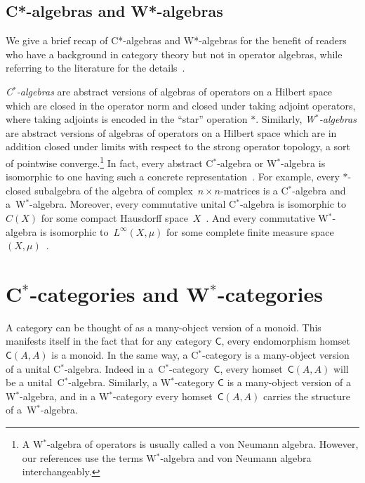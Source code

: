 \documentclass[reqno,T1,11pt]{amsproc}
\newcommand{\cat}[1]{\mathsf{#1}}		%
\theoremstyle{plain}
\theoremstyle{remark}
\numberwithin{equation}{section}
\begin{document}
\subsection*{C*-algebras and W*-algebras}  We give a brief recap of C*-algebras and W*-algebras for the benefit of readers who have a background in category theory but not in operator algebras, while referring to the literature for the details~\cite{sakai,kr,bram}.
 
\emph{C$^*$-algebras} are abstract versions of algebras of operators
on a Hilbert space which are closed in the operator norm and closed
under taking adjoint operators, where taking adjoints is encoded
in the ``star'' operation $*$. Similarly, \emph{W$^*$-algebras} are
abstract versions of algebras of operators on a Hilbert space which
are in addition closed under limits with respect to the strong
operator topology, a sort of pointwise converge.\footnote{A W$^*$-algebra
    of operators is usually called a von Neumann algebra.
    However, our references \cite{bas,bram} use the terms W$^*$-algebra and
        von Neumann algebra interchangeably.}
In fact, every abstract C$^*$-algebra or W$^*$-algebra is isomorphic
to one having such a concrete representation~\cite[\S30\textsubscript{XIV}, \S48\textsubscript{VII}]{bram}.
For example, every $*$-closed subalgebra
of the algebra of complex~$n\times n$-matrices is a C$^*$-algebra
and a~W$^*$-algebra. Moreover, every commutative unital C$^*$-algebra
is isomorphic to~$C(X)$ for some compact Hausdorff space~$X$~\cite[\S27]{bram}. And
every commutative W$^*$-algebra is isomorphic to~$L^\infty(X,\mu)$
for some complete finite measure space~$(X,\mu)$~\cite[\S53\textsubscript{XI}]{bram}.

\section{C$^*$-categories and W$^*$-categories}
\label{background}

A category can be thought of as a many-object version of a monoid.
This manifests itself in the fact that for any category $\cat{C}$,
every endomorphism homset $\cat{C}(A,A)$ is a monoid. In the same
way, a C$^*$-category is a many-object version of a unital
C$^*$-algebra. Indeed in a~C$^*$-category~$\cat{C}$, every
homset~$\cat{C}(A,A)$ will be a unital~C$^*$-algebra. Similarly, a
W$^*$-category $\cat{C}$ is a many-object version of a W$^*$-algebra,
and in a W$^*$-category every homset~$\cat{C}(A,A)$ carries the structure of
a~W$^*$-algebra.
\end{document}
